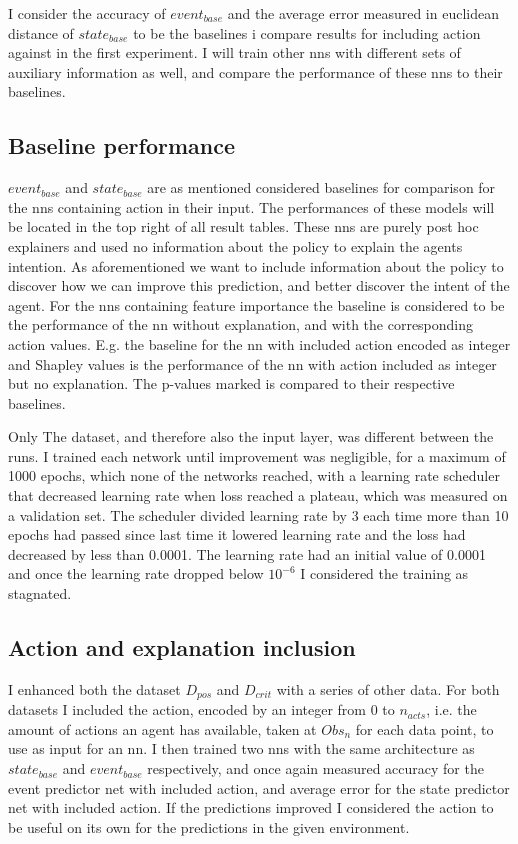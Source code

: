 \documentclass[UKenglish]{uiomasterthesis}
\begin{document}
I consider the accuracy of $event_{base}$ and the average error measured in euclidean distance of $state_{base}$ to be the baselines i compare results for including action against in the first experiment. I will train other \acp{nn} with different sets of auxiliary information as well, and compare the performance of these \acp{nn} to their baselines.


\subsection{Baseline performance}
$event_{base}$ and $state_{base}$ are as mentioned considered baselines for comparison for the \acp{nn} containing action in their input. The performances of these models will be located in the top right of all result tables. These \acp{nn} are purely post hoc explainers and used no information about the policy to explain the agents intention. As aforementioned we want to include information about the policy to discover how we can improve this prediction, and better discover the intent of the agent. For the \acp{nn} containing feature importance the baseline is considered to be the performance of the \ac{nn} without explanation, and with the corresponding action values. E.g. the baseline for the \ac{nn} with included action encoded as integer and Shapley values is the performance of the \ac{nn} with action included as integer but no explanation. The p-values marked is compared to their respective baselines.

Only The dataset, and therefore also the input layer, was different between the runs. I trained each network until improvement was negligible, for a maximum of 1000 epochs, which none of the networks reached, with a learning rate scheduler that decreased learning rate when loss reached a plateau, which was measured on a validation set. The scheduler divided learning rate by 3 each time more than 10 epochs had passed since last time it lowered learning rate and the loss had decreased by less than 0.0001. The learning rate had an initial value of 0.0001 and once the learning rate dropped below $10^{-6}$ I considered the training as stagnated.

\subsection{Action and explanation inclusion}
I enhanced both the dataset $D_{pos}$ and $D_{crit}$ with a series of other data. For both datasets I included the action, encoded by an integer from $0$ to $n_{acts}$, i.e. the amount of actions an agent has available, taken at $Obs_n$ for each data point, to use as input for an \ac{nn}. I then trained two \acp{nn} with the same architecture as $state_{base}$ and $event_{base}$ respectively, and once again measured accuracy for the event predictor net with included action, and average error for the state predictor net with included action. If the predictions improved I considered the action to be useful on its own for the predictions in the given environment.
\end{document}

